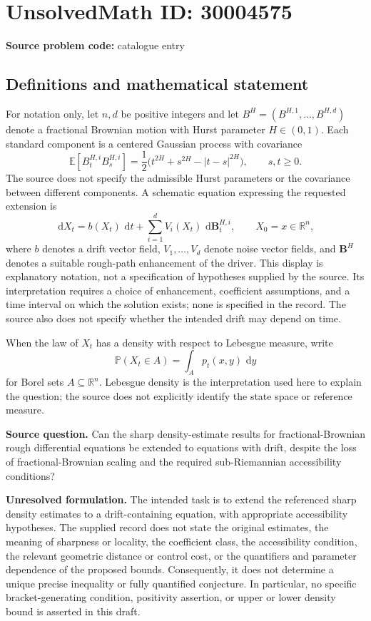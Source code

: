 \documentclass[11pt]{article}
\newcommand{\R}{\mathbb{R}}
\newcommand{\E}{\mathbb{E}}
\newcommand{\dd}{\,\mathrm{d}}
\begin{document}
\section*{UnsolvedMath ID: 30004575}
\textbf{Source problem code:} catalogue entry
\subsection{Definitions and mathematical statement}
For notation only, let \(n,d\) be positive integers and let \(B^H=(B^{H,1},\ldots,B^{H,d})\) denote a fractional Brownian motion with Hurst parameter \(H\in(0,1)\). Each standard component is a centered Gaussian process with covariance
\[
\E[B^{H,i}_tB^{H,i}_s]=\frac12\bigl(t^{2H}+s^{2H}-|t-s|^{2H}\bigr),\qquad s,t\geq0.
\]
The source does not specify the admissible Hurst parameters or the covariance between different components. A schematic equation expressing the requested extension is
\[
\dd X_t=b(X_t)\,\dd t+\sum_{i=1}^{d}V_i(X_t)\,\dd\mathbf B^{H,i}_t,\qquad X_0=x\in\R^n,
\]
where \(b\) denotes a drift vector field, \(V_1,\ldots,V_d\) denote noise vector fields, and \(\mathbf B^H\) denotes a suitable rough-path enhancement of the driver. This display is explanatory notation, not a specification of hypotheses supplied by the source. Its interpretation requires a choice of enhancement, coefficient assumptions, and a time interval on which the solution exists; none is specified in the record. The source also does not specify whether the intended drift may depend on time.

When the law of \(X_t\) has a density with respect to Lebesgue measure, write
\[
\mathbb P(X_t\in A)=\int_A p_t(x,y)\,\dd y
\]
for Borel sets \(A\subseteq\R^n\). Lebesgue density is the interpretation used here to explain the question; the source does not explicitly identify the state space or reference measure.

\textbf{Source question.} Can the sharp density-estimate results for fractional-Brownian rough differential equations be extended to equations with drift, despite the loss of fractional-Brownian scaling and the required sub-Riemannian accessibility conditions?

\textbf{Unresolved formulation.} The intended task is to extend the referenced sharp density estimates to a drift-containing equation, with appropriate accessibility hypotheses. The supplied record does not state the original estimates, the meaning of sharpness or locality, the coefficient class, the accessibility condition, the relevant geometric distance or control cost, or the quantifiers and parameter dependence of the proposed bounds. Consequently, it does not determine a unique precise inequality or fully quantified conjecture. In particular, no specific bracket-generating condition, positivity assertion, or upper or lower density bound is asserted in this draft.
\end{document}
